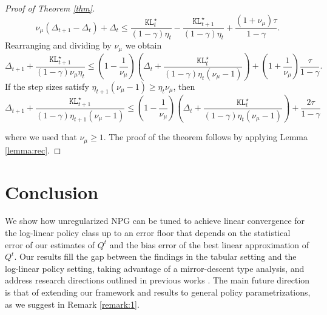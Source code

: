 \documentclass[a4paper,12pt]{article}
\numberwithin{theorem}{section}
\newcommand\1{\mathbf{1}}
\newcommand\KL{\mathtt{KL}}
\begin{document}
\begin{proof}[Proof of Theorem \ref{thm}]
\[ \nu_\mu\left(\Delta_{t+1}-\Delta_t\right)+\Delta_t\leq\frac{\KL^\star_t}{(1-\gamma)\eta_t} -\frac{\KL^\star_{t+1}}{(1-\gamma)\eta_t}+\frac{(1+\nu_\mu)\tau}{1-\gamma}.\]
Rearranging and dividing by $\nu_\mu$ we obtain
\[\Delta_{t+1} + \frac{\KL^\star_{t+1}}{(1-\gamma) \nu_\mu\eta_t} \leq \left(1-\frac{1}{ \nu_\mu}\right)\left(\Delta_t+\frac{\KL^\star_t}{(1-\gamma)\eta_t( \nu_\mu-1)}\right) +\left(1+\frac{1}{\nu_\mu}\right)\frac{\tau}{1-\gamma}.\]
If the step sizes satisfy $\eta_{t+1}( \nu_\mu-1)\geq\eta_t \nu_\mu$, then
\[\Delta_{t+1} + \frac{\KL^\star_{t+1}}{(1-\gamma)\eta_{t+1}( \nu_\mu-1)} \leq \left(1-\frac{1}{ \nu_\mu}\right)\left(\Delta_t+\frac{\KL^\star_t}{(1-\gamma)\eta_t( \nu_\mu-1)}\right) +\frac{2\tau}{1-\gamma}\]

where we used that $\nu_\mu\geq 1$. The proof of the theorem follows by applying Lemma \ref{lemma:rec}.
\end{proof}


\section{Conclusion}
\label{conc}
We show how unregularized NPG can be tuned to achieve linear convergence for the log-linear policy class up to an error floor that depends on the statistical error of our estimates of $Q^t$ and the bias error of the best linear approximation of $Q^t$. Our results fill the gap between the findings in the tabular setting and the log-linear policy setting, taking advantage of a mirror-descent type analysis, and address research directions outlined in previous works \citep{RN266}. The main future direction is that of extending our framework and results to general policy parametrizations, as we suggest in Remark \ref{remark:1}.




\end{document}
